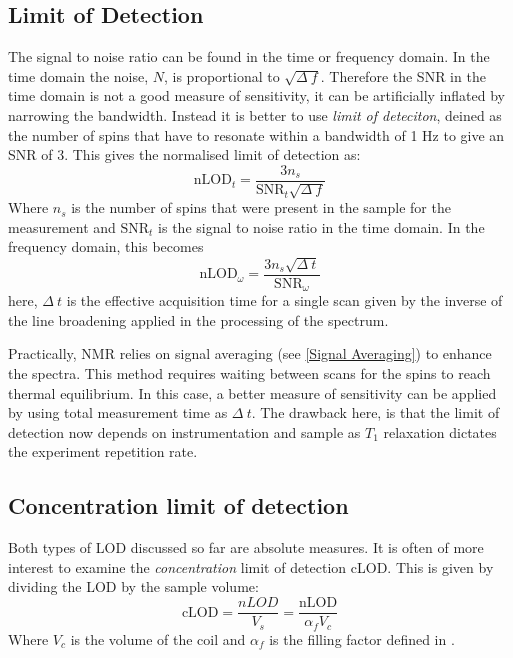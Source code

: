 \subsection{Limit of Detection}

The signal to noise ratio can be found in the time or frequency domain. In the time domain the noise, $N$, is proportional to
$\sqrt{\Delta~f}$. Therefore the SNR in the time domain is not a good measure of sensitivity, it can be
artificially inflated by narrowing the bandwidth. Instead it is better to use \textit{limit of deteciton}, deined as
the number of spins that have to resonate within a bandwidth of 1 Hz to give an SNR of 3. This gives
the normalised limit of detection as\citep{Badilita:2011td}:
\begin{equation}
  \text{nLOD}_{t} = \frac{3n_s}{\text{SNR}_{t}\sqrt{\Delta~f}}
\end{equation}
Where $n_s$ is the number of spins that were present in the sample for the measurement and $\text{SNR}_t$ is the
signal to noise ratio in the time domain.
In the frequency domain, this becomes
\begin{equation}\label{eqn:nLOD}
  \text{nLOD}_\omega = \frac{3n_s\sqrt{\Delta~t}}{\text{SNR}_\omega}
\end{equation}
here, $\Delta~t$ is the effective acquisition time for a single scan given by the inverse of the
line broadening applied in the processing of the spectrum.

Practically, NMR relies on signal averaging (see \ref{Signal Averaging}) to enhance the spectra. This
method requires waiting between scans for the spins to reach thermal equilibrium. In
this case, a better measure of sensitivity can be applied by using total measurement time
as $\Delta~t$. The drawback here, is that the limit of detection now depends on instrumentation
and sample as $T_1$ relaxation dictates the experiment repetition rate.

\subsection{Concentration limit of detection}

Both types of LOD discussed so far are absolute measures. It is often of more
interest to examine the \textit{concentration} limit of detection cLOD. This is given by
dividing the LOD by the sample volume:
\begin{equation}\label{eqn:cLOD}
  \text{cLOD} = \frac{nLOD}{V_s} =\frac{\text{nLOD}}{\alpha_fV_c}
\end{equation}
Where $V_c$ is the volume of the coil and $\alpha_f$ is the filling factor defined in .

